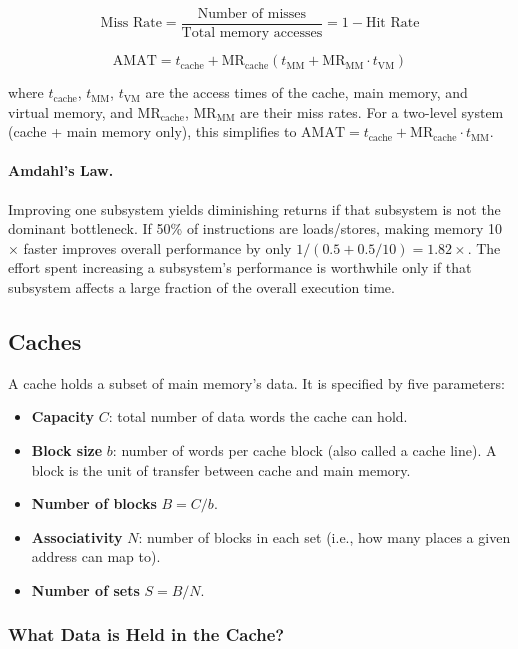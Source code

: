 \documentclass[9pt, a4paper]{extarticle}
\begin{document}
$$
\text{Miss Rate} = \frac{\text{Number of misses}}{\text{Total memory accesses}} = 1 - \text{Hit Rate}
$$

$$
\text{AMAT} = t_{\text{cache}} + \text{MR}_{\text{cache}}\!\left(t_{\text{MM}} + \text{MR}_{\text{MM}} \cdot t_{\text{VM}}\right)
$$

where $t_{\text{cache}}$, $t_{\text{MM}}$, $t_{\text{VM}}$ are the access times of the cache, main memory, and virtual memory, and $\text{MR}_{\text{cache}}$, $\text{MR}_{\text{MM}}$ are their miss rates. For a two-level system (cache + main memory only), this simplifies to $\text{AMAT} = t_{\text{cache}} + \text{MR}_{\text{cache}} \cdot t_{\text{MM}}$.

\paragraph{Amdahl's Law.} Improving one subsystem yields diminishing returns if that subsystem is not the dominant bottleneck. If 50\% of instructions are loads/stores, making memory 10$\times$ faster improves overall performance by only $1/(0.5 + 0.5/10) = 1.82\times$. The effort spent increasing a subsystem's performance is worthwhile only if that subsystem affects a large fraction of the overall execution time.

\subsection{Caches}
\label{sec:caches}

A cache holds a subset of main memory's data. It is specified by five parameters:

\begin{itemize}
    \item \textbf{Capacity} $C$: total number of data words the cache can hold.
    \item \textbf{Block size} $b$: number of words per cache block (also called a cache line). A block is the unit of transfer between cache and main memory.
    \item \textbf{Number of blocks} $B = C / b$.
    \item \textbf{Associativity} $N$: number of blocks in each set (i.e., how many places a given address can map to).
    \item \textbf{Number of sets} $S = B / N$.
\end{itemize}

\subsubsection{What Data is Held in the Cache?}
\end{document}
